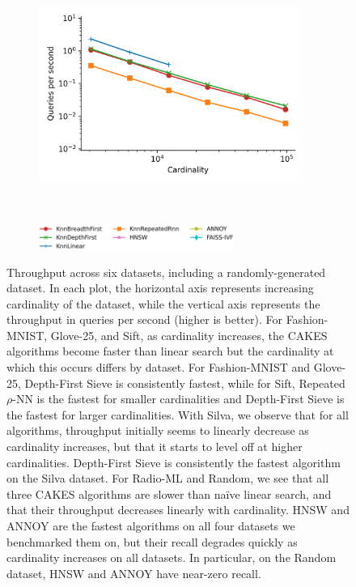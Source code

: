 \begin{figure}
\begin{subfigure}[b]{0.5\textwidth}
        \label{fig:results:silva-scaling}
    \end{subfigure}%
    \begin{subfigure}[b]{0.5\textwidth}
        \includegraphics[width=0.95\textwidth]{plots/radio-ml_Ball_10_throughput.png}
        \label{fig:results:radioml-scaling}
    \end{subfigure}%
    \\
    \begin{subfigure}[b]{0.94\textwidth}
        \centering
        \includegraphics[width=0.7\textwidth]{plots/legend.png}
        \label{fig:results:scaling-legend}
    \end{subfigure}%
    \caption{Throughput across six datasets, including a randomly-generated dataset.
    In each plot, the horizontal axis represents increasing cardinality of the dataset, while the vertical axis represents the throughput in queries per second (higher is better).
    For Fashion-MNIST, Glove-25, and Sift, as cardinality increases, the CAKES algorithms become faster than linear search but the cardinality at which this occurs differs by dataset.
    For Fashion-MNIST and Glove-25, Depth-First Sieve is consistently fastest, while for Sift, Repeated $\rho$-NN is the fastest for smaller cardinalities and Depth-First Sieve is the fastest for larger cardinalities.
    With Silva, we observe that for all algorithms, throughput initially seems to linearly decrease as cardinality increases, but that it starts to level off at higher cardinalities.
    Depth-First Sieve is consistently the fastest algorithm on the Silva dataset.
    For Radio-ML and Random, we see that all three CAKES algorithms are slower than na\"{i}ve linear search, and that their throughput decreases linearly with cardinality.
    HNSW and ANNOY are the fastest algorithms on all four datasets we benchmarked them on, but their recall degrades quickly as cardinality increases on all datasets.
    In particular, on the Random dataset, HNSW and ANNOY have near-zero recall.}
    \label{fig:results:scaling-plots}
\end{figure}


